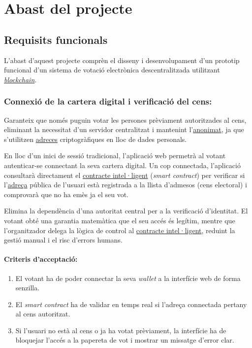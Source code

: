 \section{Abast del projecte}

\subsection{Requisits funcionals}

L'abast d'aquest projecte comprèn el disseny i desenvolupament d'un prototip funcional d'un sistema de votació electrònica descentralitzada utilitzant \hyperlink{def:blockchain}{\textit{blockchain}}.

\subsubsection{Connexió de la cartera digital i verificació del cens:}

Garanteix que només puguin votar les persones prèviament autoritzades al cens, eliminant la necessitat d'un servidor centralitzat i mantenint l'\hyperlink{def:anonimat}{anonimat}, ja que s'utilitzen \hyperlink{def:adreca}{adreces} criptogràfiques en lloc de dades personals.

En lloc d'un inici de sessió tradicional, l'aplicació web permetrà al votant autenticar-se connectant la seva cartera digital.
Un cop connectada, l'aplicació consultarà directament el \hyperlink{def:smartcontract}{contracte intel·ligent} (\textit{smart contract}) per verificar si l'\hyperlink{def:adreca}{adreça} pública de l'usuari està registrada a la llista d'admesos (cens electoral) i comprovarà que no ha emès ja el seu vot.

Elimina la dependència d'una autoritat central per a la verificació d'identitat. 
El votant obté una garantia matemàtica que el seu accés és legítim, mentre que l'organitzador delega la lògica de control al \hyperlink{def:smartcontract}{contracte intel·ligent}, reduint la gestió manual i el risc d'errors humans.

\paragraph{Criteris d'acceptació:}
\begin{enumerate}[label=\roman*.]
    \item El votant ha de poder connectar la seva \textit{wallet} a la interfície web de forma senzilla.
    \item El \textit{smart contract} ha de validar en temps real si l'adreça connectada pertany al cens autoritzat.
    \item Si l'usuari no està al cens o ja ha votat prèviament, la interfície ha de bloquejar l'accés a la papereta de vot i mostrar un missatge d'error clar.
\end{enumerate}

